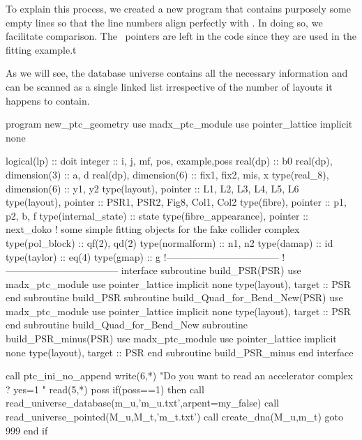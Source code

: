 To explain this process, we created a new program
 that contains purposely some empty lines so
that the line numbers align perfectly with . In
doing so, we facilitate comparison. The \DNA\ pointers are left in the
code since they are used in the fitting example.t

As we will see, the database universe  contains all the
necessary information and can be scanned as a single linked list
irrespective of the number of layouts it happens to contain.

\begin{ptccode}[
  label={\ptctitle{\ptc{new_ptc_geometry.f90}\quad\small This program
                   describes the geometry of several \PTC\ lattices using two ``MAD universes.''}}
]
program new_ptc_geometry
use madx_ptc_module
use pointer_lattice
implicit none

logical(lp) :: doit
integer :: i, j, mf, pos, example,poss
real(dp) :: b0
real(dp), dimension(3) :: a, d
real(dp), dimension(6) :: fix1, fix2, mis, x
type(real_8), dimension(6) :: y1, y2
type(layout), pointer :: L1, L2, L3, L4, L5, L6
type(layout), pointer :: PSR1, PSR2, Fig8, Col1, Col2
type(fibre), pointer :: p1, p2, b, f
type(internal_state) :: state
type(fibre_appearance), pointer :: next_doko
! some simple fitting objects for the fake collider complex
type(pol_block) :: qf(2), qd(2)
type(normalform) :: n1, n2
type(damap) :: id
type(taylor) :: eq(4)
type(gmap) :: g
!-----------------------------------
!-----------------------------------
    interface
       subroutine build_PSR(PSR)
         use madx_ptc_module
         use pointer_lattice
         implicit none
         type(layout), target :: PSR
       end subroutine build_PSR
       subroutine build_Quad_for_Bend_New(PSR)
         use madx_ptc_module
         use pointer_lattice
         implicit none
         type(layout), target :: PSR
       end subroutine build_Quad_for_Bend_New
       subroutine build_PSR_minus(PSR)
         use madx_ptc_module
         use pointer_lattice
         implicit none
         type(layout), target :: PSR
       end subroutine build_PSR_minus
    end interface

call ptc_ini_no_append \label{lin:init.layout2}
write(6,*) "Do you want to read an accelerator complex ? yes=1 "  \label{lin:read:uni1}
read(5,*) poss
if(poss==1) then
 call read_universe_database(m_u,'m_u.txt',arpent=my_false)
 call read_universe_pointed(M_u,M_t,'m_t.txt')
 call create_dna(M_u,m_t)
 goto 999
end if  \label{lin:read:uni2}
\end{ptccode}

